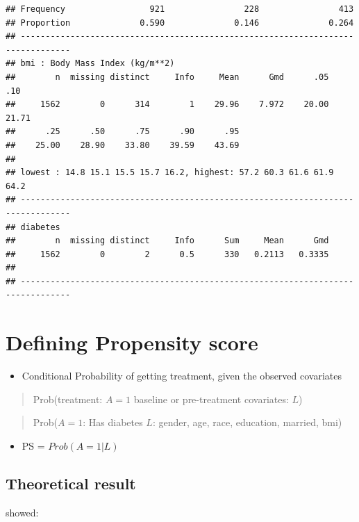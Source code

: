 \documentclass[
]{book}
\providecommand{\tightlist}{%
  \setlength{\itemsep}{0pt}\setlength{\parskip}{0pt}}
\begin{document}
\begin{verbatim}
## Frequency                 921                228                413
## Proportion              0.590              0.146              0.264
## --------------------------------------------------------------------------------
## bmi : Body Mass Index (kg/m**2) 
##        n  missing distinct     Info     Mean      Gmd      .05      .10 
##     1562        0      314        1    29.96    7.972    20.00    21.71 
##      .25      .50      .75      .90      .95 
##    25.00    28.90    33.80    39.59    43.69 
## 
## lowest : 14.8 15.1 15.5 15.7 16.2, highest: 57.2 60.3 61.6 61.9 64.2
## --------------------------------------------------------------------------------
## diabetes 
##        n  missing distinct     Info      Sum     Mean      Gmd 
##     1562        0        2      0.5      330   0.2113   0.3335 
## 
## --------------------------------------------------------------------------------
\end{verbatim}

\hypertarget{defining-propensity-score}{%
\section{Defining Propensity score}\label{defining-propensity-score}}

\begin{itemize}
\tightlist
\item
  Conditional Probability of getting treatment, given the observed covariates
\end{itemize}

\begin{quote}
Prob(treatment: \(A = 1\) \textbar{} baseline or pre-treatment covariates: \(L\))
\end{quote}

\begin{quote}
Prob(\(A = 1\): Has diabetes \textbar{} \(L\): gender, age, race, education, married, bmi)
\end{quote}

\begin{itemize}
\tightlist
\item
  PS = \(Prob(A=1|L)\)
\end{itemize}

\hypertarget{theoretical-result}{%
\subsection{Theoretical result}\label{theoretical-result}}

\citet{rosenbaum1983central} showed:
\end{document}
